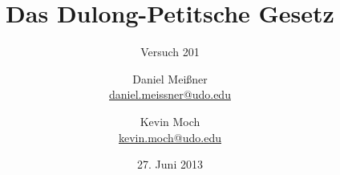 


\newcommand{\name}[1]{\textsc{#1}}

\titlehead{{TU Dortmund \hfill SS~13}\\
Fakultät Physik\\
Experimentelle Übungen II}

\subject{Versuchsprotokoll}
\title{Das Dulong-Petitsche Gesetz}
\subtitle{Versuch 201}

\author{Daniel Meißner\\
{\normalsize\url{daniel.meissner@udo.edu}}
\and
Kevin Moch\\
{\normalsize\url{kevin.moch@udo.edu}}}

\date{27. Juni 2013}


\maketitle

\tableofcontents
\clearpage







\printbibliography
\nocite{v201}



